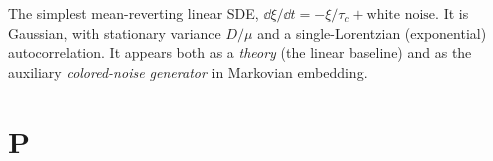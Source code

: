 \begin{description}[leftmargin=0pt,style=nextline]
  \item[Ornstein--Uhlenbeck (OU) process] The simplest mean-reverting linear SDE,
        $\dd\xi/\dd t=-\xi/\tau_c+\text{white noise}$. It is Gaussian, with
        stationary variance $D/\mu$ and a single-Lorentzian (exponential)
        autocorrelation. It appears both as a \emph{theory} (the linear baseline)
        and as the auxiliary \emph{colored-noise generator} in Markovian embedding.

\end{description}

\section*{P}
